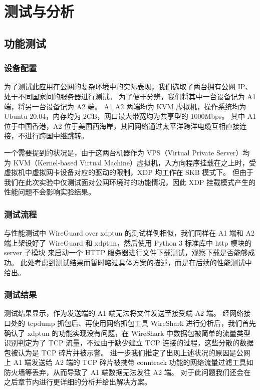 

\chapter{测试与分析}

\section{功能测试}

\subsection{设备配置}

为了测试此应用在公网的复杂环境中的实际表现，我们选取了两台拥有公网 IP、处于不同国家间的服务器进行测试。
为了便于分辨，我们将其中一台设备记为 A1 端，将另一台设备记为 A2 端。
A1 A2 两端均为 KVM 虚拟机，操作系统均为 Ubuntu 20.04，内存均为 2GB，网口最大带宽均为共享型的 1000Mbps。
其中 A1 位于中国香港，A2 位于美国西海岸，其间网络通过太平洋跨洋电缆互相直接连接，不进行跨国中继跳转。

一个需要提到的状况是，由于这两台机器作为 VPS（Virtual Private Server）均为 KVM（Kernel-based Virtual Machine）虚拟机，入方向程序挂载在之上时，受虚拟机中虚拟网卡设备对应的驱动的限制，XDP 均工作在 SKB 模式下。
但由于我们在此次实验中仅测试面对公网环境时的功能情况，因此 XDP 挂载模式产生的性能问题不会影响实验结果。

\subsection{测试流程}

与性能测试中 WireGuard over xdptun 的测试样例相似，我们同样在 A1 端和 A2 端上架设好了 WireGuard 和 xdptun，然后使用 Python 3 标准库中 http 模块的 server 子模块 来启动一个 HTTP 服务器进行文件下载测试，观察下载是否能够成功。
此处考虑到测试结果而暂时略过具体方案的描述，而是在后续的性能测试中给出。

\subsection{测试结果}

测试结果显示，作为发送端的 A1 端无法将文件发送至接受端 A2 端。
经网络接口处的 tcpdump 抓包后、再使用网络抓包工具 WireShark 进行分析后，我们首先确认了 xdptun 的功能实现没有问题，在 WireShark 中数据包被简单的流量类型识别判定为了 TCP 流量，不过由于缺少建立 TCP 连接的过程，这些分散的数据包被认为是 TCP 碎片并被示警。
进一步我们推定了出现上述状况的原因是公网上 A1 端发送给 A2 端的 TCP 碎片被携带 conntrack 功能的网络流量过滤工具如防火墙等丢弃，从而导致了 A1 端数据无法发往 A2 端。
对于此问题我们还会在之后章节内进行更详细的分析并给出解决方案。

